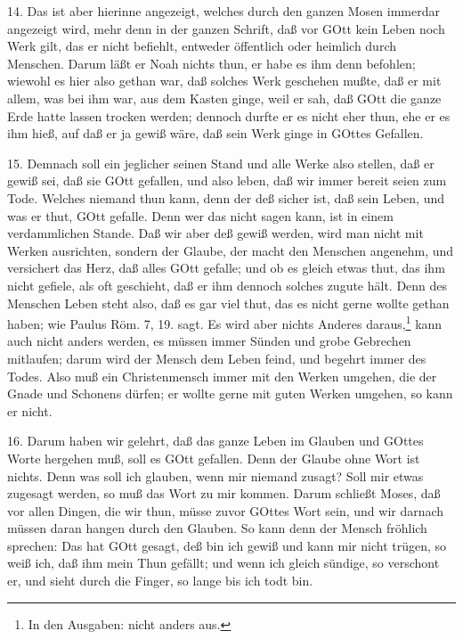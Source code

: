 14. Das ist aber hierinne angezeigt, welches durch den ganzen Mosen immerdar angezeigt wird, mehr denn in der ganzen Schrift, daß vor GOtt kein Leben noch Werk gilt, das er nicht befiehlt, entweder öffentlich oder heimlich durch Menschen. Darum läßt er Noah nichts thun, er habe es ihm denn befohlen; wiewohl es hier also gethan war, daß solches Werk geschehen mußte, daß er mit allem, was bei ihm war, aus dem Kasten ginge, weil er sah, daß GOtt die ganze Erde hatte lassen trocken werden; dennoch durfte er es nicht eher thun, ehe er es ihm hieß, auf daß er ja gewiß wäre, daß sein Werk ginge in GOttes Gefallen.

15. Demnach soll ein jeglicher seinen Stand und alle Werke also stellen, daß er gewiß sei, daß sie GOtt gefallen, und also leben, daß wir immer bereit seien zum Tode. Welches niemand thun kann, denn der deß sicher ist, daß sein Leben, und was er thut, GOtt gefalle. Denn wer das nicht sagen kann, ist in einem verdammlichen Stande. Daß wir aber deß gewiß werden, wird man nicht mit Werken ausrichten, sondern der Glaube, der macht den Menschen angenehm, und versichert das Herz, daß alles GOtt gefalle; und ob es gleich etwas thut, das ihm nicht gefiele, als oft geschieht, daß er ihm dennoch solches zugute hält. Denn des Menschen Leben steht also, daß es gar viel thut, das es nicht gerne wollte gethan haben; wie Paulus Röm. 7, 19. sagt. Es wird aber nichts Anderes daraus,\footnote{In den Ausgaben: nicht anders aus.} kann auch nicht anders werden, es müssen immer Sünden und grobe Gebrechen mitlaufen; darum wird der Mensch dem Leben feind, und begehrt immer des Todes. Also muß ein Christenmensch immer mit den Werken umgehen, die der Gnade und Schonens dürfen; er wollte gerne mit guten Werken umgehen, so kann er nicht.

16. Darum haben wir gelehrt, daß das ganze Leben im Glauben und GOttes Worte hergehen muß, soll es GOtt gefallen. Denn der Glaube ohne Wort ist nichts. Denn was soll ich glauben, wenn mir niemand zusagt? Soll mir etwas zugesagt werden, so muß das Wort zu mir kommen. Darum schließt Moses, daß vor allen Dingen, die wir thun, müsse zuvor GOttes Wort sein, und wir darnach müssen daran hangen durch den Glauben. So kann denn der Mensch fröhlich sprechen: Das hat GOtt gesagt, deß bin ich gewiß und kann mir nicht trügen, so weiß ich, daß ihm mein Thun gefällt; und wenn ich gleich sündige, so verschont er, und sieht durch die Finger, so lange bis ich todt bin.

